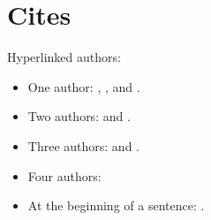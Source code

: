 \documentclass[english]{scrbook}
\begin{document}
\chapter{Cites}
Hyperlinked authors:

\begin{itemize}
  \item One author: \citeauthor{Ez10} \cite{Ez10}, \citeauthor{Go10} \cite{Go10}, and \citeauthor{latexcookbook} \cite{latexcookbook}.
  \item Two authors: \citeauthor{AB00} \cite{AB00} and \citeauthor{vdAW2013} \cite{vdAW2013}.
  \item Three authors: \citeauthor{ABC01} \cite{ABC01} and \citeauthor{jabref} \cite{jabref}.
  \item Four authors: \citeauthor{ABCD02} \cite{ABCD02}
  \item At the beginning of a sentence: .
\end{itemize}

\nocite{*}
\printbibliography
\end{document}
